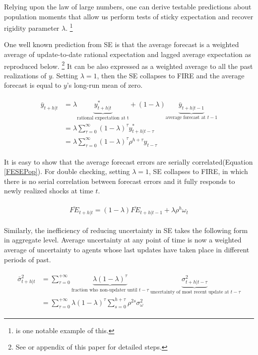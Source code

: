 \documentclass[]{article}
\begin{document}
	Relying upon the law of large numbers, one can derive testable predictions about population moments that allow us perform tests of sticky expectation and recover rigidity parameter $\lambda$. \footnote{\citet{carroll2003macroeconomic} is one notable example of this.} 
	
	One well known prediction from SE is that the average forecast is a weighted average of update-to-date rational expectation and lagged average expectation as reproduced below. \footnote{See \citet{coibion2012can} or appendix of this paper for detailed steps.} It can be also expressed as a weighted average to all the past realizations of $y$. Setting $\lambda=1$, then the SE collapses to FIRE and the average forecast is equal to $y$'s long-run mean of zero.
	
	\begin{eqnarray}\label{MeanSEPop}
		\begin{aligned}
			\bar y_{t+h|t} & = \lambda \underbrace{y^*_{t+h|t}}_{\textrm{rational expectation at t}} + (1-\lambda) \underbrace{\bar y_{t+h|t-1}}_{\textrm{average forecast at } t-1} \\
			& = \lambda \sum^{\infty}_{\tau=0} (1-\lambda)^\tau y^*_{t+h|t-\tau} \\
			& = \lambda \sum^{\infty}_{\tau=0} (1-\lambda)^\tau \rho^{h+\tau}y_{t-\tau}
		\end{aligned}
	\end{eqnarray}
	
	It is easy to show that the average forecast errors are serially correlated(Equation \ref{FESEPop}). For double checking, setting $\lambda=1$, SE collapses to FIRE, in which there is no serial correlation between forecast errors and it fully responds to newly realized shocks at time $t$.  
	
	\begin{eqnarray}\label{FESEPop}
		\begin{aligned}
			\overline{FE}_{t+h|t}  = (1-\lambda) \overline {FE}_{t+h|t-1} + \lambda \rho^h \omega_t 
		\end{aligned}
	\end{eqnarray}
	
	Similarly, the inefficiency of reducing uncertainty in SE takes the following form in aggregate level. Average uncertainty at any point of time is now a weighted average of uncertainty to agents whose last updates have taken place in different periods of past. 
	
	
	\begin{eqnarray}\label{VarSEPop}
		\begin{aligned}
			\bar \sigma^2_{t+h|t} & = \sum^{+\infty}_{\tau =0} \underbrace{\lambda (1-\lambda)^\tau}_{\text{fraction who non-updater until }t-\tau} \underbrace{\sigma^2_{t+h|t-\tau}}_{\text{ uncertainty of most recent update at }t-\tau} \\
			& = \sum^{+\infty}_{\tau =0} \lambda (1-\lambda)^\tau \sum^{h+\tau}_{s=0}\rho^{2s} \sigma^2_{\omega}
		\end{aligned}
	\end{eqnarray}
	
\end{document}
